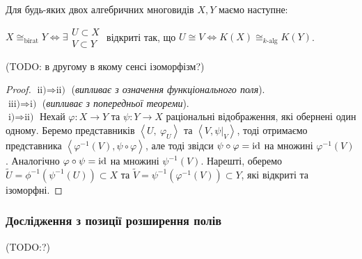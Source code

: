 \documentclass{math_library}
\begin{document}
\begin{corollary}
Для будь-яких двох алгебричних многовидів $X,Y$ маємо наступне:
\begin{center}
$X \cong_{\text{birat}} Y \iff \exists \substack{ U \subset X \\ V \subset Y }$ відкриті так, що $U \cong V \iff K(X) \cong_{\text{$k$-alg}} K(Y)$. 
\end{center}
(TODO: в другому в якому сенсі ізоморфізм?)
\end{corollary}

\begin{proof}
$\boxed{\text{ii)} \Rightarrow \text{ii)}}$ (\textit{випливає з означення функціонального поля}). \\
$\boxed{\text{iii)} \Rightarrow \text{i)}}$ (\textit{випливає з попередньої теореми}).\\
$\boxed{\text{i)} \Rightarrow \text{ii)}}$ Нехай $\varphi \colon X \to Y$ та $\psi \colon Y \to X$ раціональні відображення, які обернені один одному. Беремо представників $\left<U,\ \varphi_U\right>$ та $\left<V,\psi|_V\right>$, тоді отримаємо представника $\left< \varphi^{-1}(V), \psi \circ \varphi\right>$, але тоді звідси $\psi \circ \varphi = \operatorname{id}$ на множині $\varphi^{-1}(V)$. Аналогічно $\varphi \circ \psi = \operatorname{id}$ на множині $\psi^{-1}(V)$. Нарешті, оберемо $\tilde{U} = \phi^{-1}(\psi^{-1}(U)) \subset X$ та $\tilde{V} = \psi^{-1}(\varphi^{-1}(V)) \subset Y$, які відкриті та ізоморфні.
\end{proof}

\subsubsection{Дослідження з позиції розширення полів}
(TODO:?)
\end{document}
